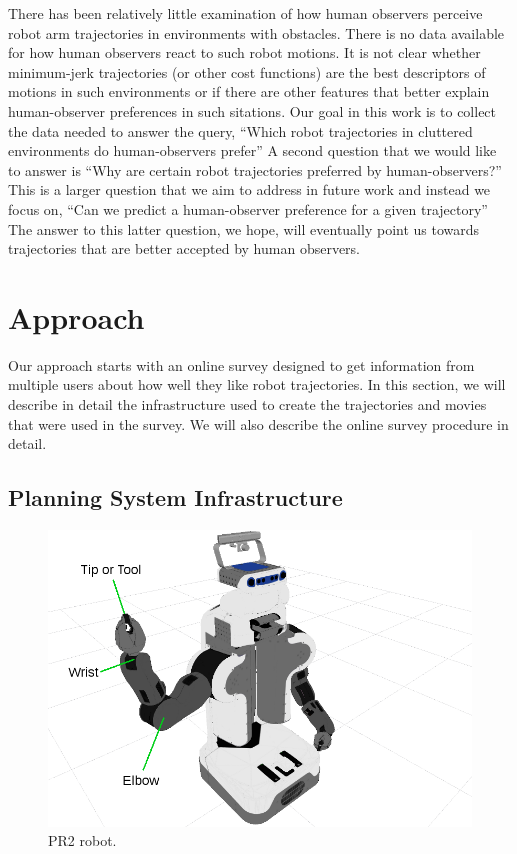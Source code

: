 \documentclass[letterpaper, 10 pt, conference]{ieeeconf}  %
\begin{document}
There has been relatively little examination of how human observers perceive robot arm trajectories in environments with obstacles. There is no data available for how human observers react to such robot motions. It is not clear whether minimum-jerk trajectories (or other cost functions) are the best descriptors of motions in such environments or if there are other features that better explain human-observer preferences in such sitations. Our goal in this work is to collect the data needed to answer the query, ``Which robot trajectories in cluttered environments do human-observers prefer'' A second question that we would like to answer is ``Why are certain robot trajectories preferred by human-observers?'' This is a larger question that we aim to address in future work and instead we focus on, ``Can we predict a human-observer preference for a given trajectory'' The answer to this latter question, we hope, will eventually point us towards trajectories that are better accepted by human observers. 

\section{Approach}
\label{sec:survey}
Our approach starts with an online survey designed to get information from multiple users about how well they like robot trajectories. In this section, we will describe in detail the infrastructure used to create the trajectories and movies that were used in the survey. We will also describe the online survey procedure in detail. 

\subsection{Planning System Infrastructure}

\begin{figure}
\centering
  \includegraphics[trim = 0mm 0mm 40mm 0mm, width=0.5\columnwidth, clip=true]{pictures/pr2_robot_4_downscale}
\caption{{\footnotesize PR2 robot.}}
\label{fig:PR2}
\vspace{0.1in}
\end{figure}
\end{document}
